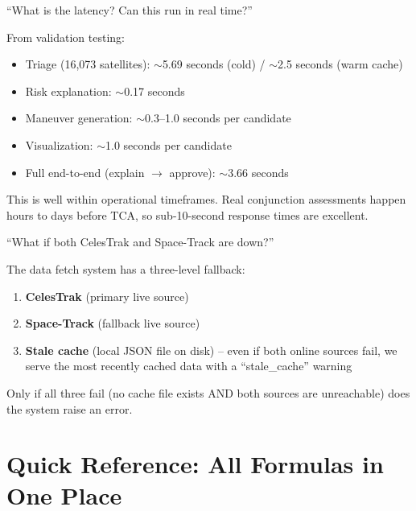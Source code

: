 \documentclass[12pt,a4paper]{article}
\begin{document}
\begin{questionbox}
``What is the latency? Can this run in real time?''
\end{questionbox}
\begin{answerbox}
From validation testing:
\begin{itemize}
    \item Triage (16,073 satellites): $\sim$5.69 seconds (cold) / $\sim$2.5 seconds (warm cache)
    \item Risk explanation: $\sim$0.17 seconds
    \item Maneuver generation: $\sim$0.3--1.0 seconds per candidate
    \item Visualization: $\sim$1.0 seconds per candidate
    \item Full end-to-end (explain $\to$ approve): $\sim$3.66 seconds
\end{itemize}
This is well within operational timeframes. Real conjunction assessments happen hours to days before TCA, so sub-10-second response times are excellent.
\end{answerbox}

\begin{questionbox}
``What if both CelesTrak and Space-Track are down?''
\end{questionbox}
\begin{answerbox}
The data fetch system has a three-level fallback:
\begin{enumerate}
    \item \textbf{CelesTrak} (primary live source)
    \item \textbf{Space-Track} (fallback live source)
    \item \textbf{Stale cache} (local JSON file on disk) -- even if both online sources fail, we serve the most recently cached data with a ``stale\_cache'' warning
\end{enumerate}
Only if all three fail (no cache file exists AND both sources are unreachable) does the system raise an error.
\end{answerbox}

\newpage
\section{Quick Reference: All Formulas in One Place}
\end{document}
